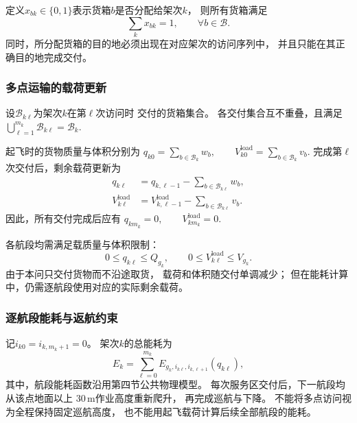 \documentclass[bwprint]{gmcmthesis}
\begin{document}
定义$x_{bk}\in\{0,1\}$表示货箱$b$是否分配给架次$k$，
则所有货箱满足
\begin{equation}
    \sum_k x_{bk}=1,
    \qquad \forall b\in\mathcal{B}.
    \label{eq:q2_box_once}
\end{equation}
同时，所分配货箱的目的地必须出现在对应架次的访问序列中，
并且只能在其正确目的地完成交付。

\subsubsection{多点运输的载荷更新}

设$\mathcal{B}_{k\ell}$为架次$k$在第$\ell$次访问时
交付的货箱集合。
各交付集合互不重叠，且满足
\(\bigcup_{\ell=1}^{m_k}\mathcal{B}_{k\ell} = \mathcal{B}_k\).

起飞时的货物质量与体积分别为
\(q_{k0}=\sum_{b\in\mathcal{B}_k}w_b, \qquad V_{k0}^{\mathrm{load}} = \sum_{b\in\mathcal{B}_k}v_b\).
完成第$\ell$次交付后，剩余载荷更新为
\begin{align}
    q_{k\ell}
    &=
    q_{k,\ell-1}
    -
    \sum_{b\in\mathcal{B}_{k\ell}}w_b,\\
    V_{k\ell}^{\mathrm{load}}
    &=
    V_{k,\ell-1}^{\mathrm{load}}
    -
    \sum_{b\in\mathcal{B}_{k\ell}}v_b.
\end{align}
因此，所有交付完成后应有
\(q_{km_k}=0, \qquad V_{km_k}^{\mathrm{load}}=0\).

各航段均需满足载质量与体积限制：
\begin{equation}
    0\leq q_{k\ell}\leq Q_{g_k},
    \qquad
    0\leq V_{k\ell}^{\mathrm{load}}\leq V_{g_k}.
\end{equation}
由于本问只交付货物而不沿途取货，
载荷和体积随交付单调减少；
但在能耗计算中，仍需逐航段使用对应的实际剩余载荷。

\subsubsection{逐航段能耗与返航约束}

记$i_{k0}=i_{k,m_k+1}=0$。
架次$k$的总能耗为
\begin{equation}
    E_k
    =
    \sum_{\ell=0}^{m_k}
    E_{g_k,i_{k\ell},i_{k,\ell+1}}(q_{k\ell}),
    \label{eq:q2_sortie_energy}
\end{equation}
其中，航段能耗函数沿用第四节公共物理模型。
每次服务区交付后，下一航段均从该点地面以上
$30\,\mathrm{m}$作业高度重新爬升，
再完成巡航与下降。
不能将多点访问视为全程保持固定巡航高度，
也不能用起飞载荷计算后续全部航段的能耗。
\end{document}

